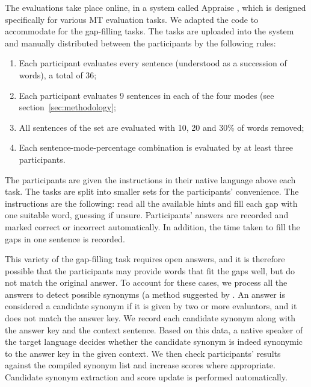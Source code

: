 \documentclass[11pt]{article}
\newcommand{\comment}[1]{\marginpar{\scriptsize\sf \textcolor{blue}{#1}}}
\begin{document}
The evaluations take place online, in a system called Appraise \citep{federmann12}, which is 
designed specifically for various MT evaluation tasks. We adapted the code to 
accommodate for the gap-filling tasks. The tasks are uploaded into the system and 
manually distributed between the participants by the following rules:
\begin{enumerate}
\item  Each participant evaluates every sentence (understood as a succession of words),
a total of 36;
\item  Each participant evaluates 9 sentences in each of the four modes (see section~\ref{sec:methodology};
\item  All sentences of the set are evaluated with 10, 20 and 30\% of words removed;
\item  Each sentence-mode-percentage combination is evaluated by at least three participants.
\end{enumerate}

The participants are given the instructions in their native language above each task. The
tasks are split into smaller sets for the participants' convenience. The instructions are the 
following: read all the available hints and fill each gap with one suitable word, guessing if unsure.
Participants' answers are recorded and marked correct or incorrect automatically. In
addition, the time taken to fill the gaps in one sentence is recorded.

This variety of the gap-filling task requires open answers, and it is therefore possible that the participants may
provide words that fit the gaps well, but do not match the original answer. To account for
these cases, we process all the answers to detect possible synonyms (a method suggested by \citet{oregan13}. An answer is
considered a candidate synonym if it is given by two or more evaluators, and it does not match
the answer key. We record each candidate synonym along with the answer key and the
context sentence. Based on this data, a native speaker of the target language decides
whether the candidate synonym is indeed synonymic to the answer key in the given
context. We then check participants' results against the compiled synonym list and
increase scores where appropriate. Candidate synonym extraction and score update is performed automatically.
\comment{FMT: How long did making the synonym list take, how many synonyms were added? More details here. Also perhaps an example?}

\comment{EA: the sections below are from the report and have not been edited yet.}
\end{document}
